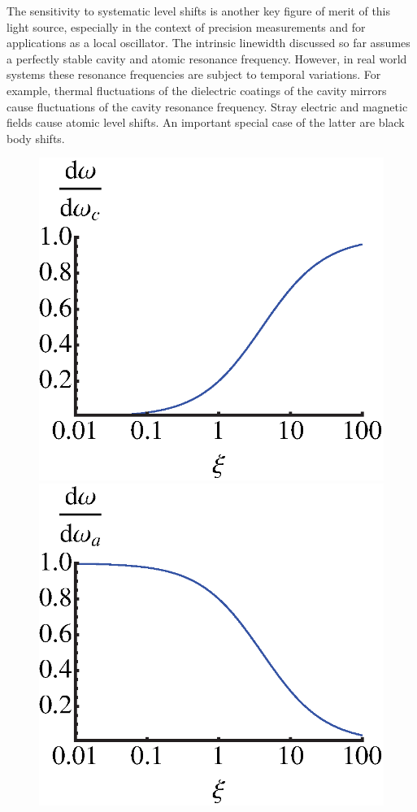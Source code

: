\documentclass[aps,
twocolumn,
showpacs,
superscriptaddress,groupedaddress]{revtex4}
\begin{document}
The sensitivity to systematic level shifts is another key figure of
merit of this light source, especially in the context of precision
measurements and for applications as a local oscillator.  The intrinsic
linewidth discussed so far assumes a perfectly stable cavity and atomic
resonance frequency.  However, in real world systems these resonance
frequencies are subject to temporal variations.  For example, thermal
fluctuations of the dielectric coatings of the cavity mirrors cause
fluctuations of the cavity resonance frequency.  Stray electric and
magnetic fields cause atomic level shifts.  An important special case of
the latter are black body shifts.
\begin{figure}
\begin{center}
	\includegraphics[scale=0.42] {CavityInstability.eps} \hspace{2mm}
	\includegraphics[scale=0.42] {AtomInstability.eps}\\

\end{center}
\end{figure}
\end{document}
